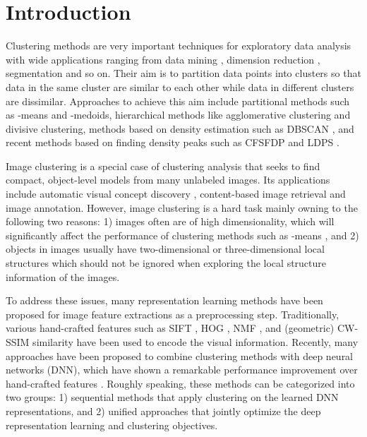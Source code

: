 \documentclass[preprint,12pt]{elsarticle}
\begin{document}
\section{Introduction}
\label{sec:intro}

Clustering methods are very important techniques for exploratory data analysis with wide applications ranging from
data mining \cite{Han2011DataMining,Berkhin2006DataMiningSurvery}, dimension reduction \cite{Boutsidis2015RDR},
segmentation \cite{Shi2000Ncuts} and so on.
Their aim is to partition data points into clusters so that data in the same cluster are similar
to each other while data in different clusters are dissimilar.
Approaches to achieve this aim include partitional methods such as -means and -medoids, hierarchical
methods like agglomerative clustering and divisive clustering, methods based on density estimation such as
DBSCAN \cite{ester1996density}, and recent methods based on finding density peaks such as
CFSFDP \cite{Rodriguez2016CFSFDP} and LDPS \cite{Li2016LDPS}.

Image clustering \cite{Ahmed2016review} is a special case of clustering analysis that seeks to find compact,
object-level models from many unlabeled images.
Its applications include automatic visual concept discovery \cite{Lee2011easy}, content-based image retrieval
and image annotation. However, image clustering is a hard task mainly owning to the following two reasons:
1) images often are of high dimensionality, which will significantly affect the performance of clustering methods
such as -means \cite{Ding2007AdaptiveDR}, and 2) objects in images usually have two-dimensional or three-dimensional
local structures which should not be ignored when exploring the local structure information of the images.

To address these issues, many representation learning methods have been proposed for image feature extractions
as a preprocessing step. Traditionally, various hand-crafted features such as SIFT \cite{Lowe1999SIFT},
HOG \cite{Dalal2005HOG}, NMF \cite{Hong2016jointNMF}, and (geometric) CW-SSIM
similarity \cite{Sampat2009CWSSIM,Li2016GCWSSIM} have been used to encode the visual information.
Recently, many approaches have been proposed to combine clustering methods with deep neural networks (DNN),
which have shown a remarkable performance improvement over hand-crafted features \cite{Krizhevsky2012DCNN}.
Roughly speaking, these methods can be categorized into two groups: 1) sequential methods that apply clustering
on the learned DNN representations, and 2) unified approaches that jointly optimize the deep representation
learning and clustering objectives.
\end{document}
